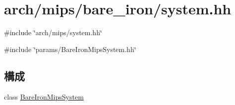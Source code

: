 \hypertarget{arch_2mips_2bare__iron_2system_8hh}{
\section{arch/mips/bare\_\-iron/system.hh}
\label{arch_2mips_2bare__iron_2system_8hh}
}
{\ttfamily \#include \char`\"{}arch/mips/system.hh\char`\"{}}\par
{\ttfamily \#include \char`\"{}params/BareIronMipsSystem.hh\char`\"{}}\par
\subsection*{構成}
\begin{DoxyCompactItemize}
\item 
class \hyperlink{classBareIronMipsSystem}{BareIronMipsSystem}
\end{DoxyCompactItemize}
